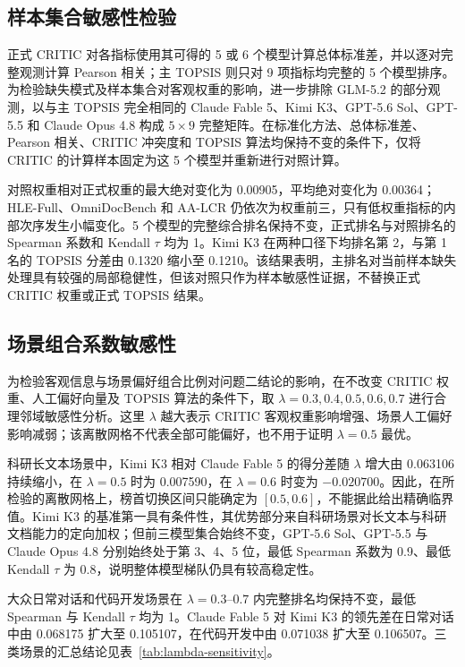 \documentclass[UTF8,zihao=-4,a4paper,fontset=none]{ctexart}
\begin{document}
\subsection{样本集合敏感性检验}

正式 CRITIC 对各指标使用其可得的 5 或 6 个模型计算总体标准差，并以逐对完整观测计算 Pearson 相关；主 TOPSIS 则只对 9 项指标均完整的 5 个模型排序。为检验缺失模式及样本集合对客观权重的影响，进一步排除 GLM-5.2 的部分观测，以与主 TOPSIS 完全相同的 Claude Fable 5、Kimi K3、GPT-5.6 Sol、GPT-5.5 和 Claude Opus 4.8 构成 $5\times9$ 完整矩阵。在标准化方法、总体标准差、Pearson 相关、CRITIC 冲突度和 TOPSIS 算法均保持不变的条件下，仅将 CRITIC 的计算样本固定为这 5 个模型并重新进行对照计算。

对照权重相对正式权重的最大绝对变化为 0.00905，平均绝对变化为 0.00364；HLE-Full、OmniDocBench 和 AA-LCR 仍依次为权重前三，只有低权重指标的内部次序发生小幅变化。5 个模型的完整综合排名保持不变，正式排名与对照排名的 Spearman 系数和 Kendall $\tau$ 均为 1。Kimi K3 在两种口径下均排名第 2，与第 1 名的 TOPSIS 分差由 0.1320 缩小至 0.1210。该结果表明，主排名对当前样本缺失处理具有较强的局部稳健性，但该对照只作为样本敏感性证据，不替换正式 CRITIC 权重或正式 TOPSIS 结果。

\subsection{场景组合系数敏感性}

为检验客观信息与场景偏好组合比例对问题二结论的影响，在不改变 CRITIC 权重、人工偏好向量及 TOPSIS 算法的条件下，取 $\lambda=0.3,0.4,0.5,0.6,0.7$ 进行合理邻域敏感性分析。这里 $\lambda$ 越大表示 CRITIC 客观权重影响增强、场景人工偏好影响减弱；该离散网格不代表全部可能偏好，也不用于证明 $\lambda=0.5$ 最优。

科研长文本场景中，Kimi K3 相对 Claude Fable 5 的得分差随 $\lambda$ 增大由 0.063106 持续缩小，在 $\lambda=0.5$ 时为 0.007590，在 $\lambda=0.6$ 时变为 $-0.020700$。因此，在所检验的离散网格上，榜首切换区间只能确定为 $[0.5,0.6]$，不能据此给出精确临界值。Kimi K3 的基准第一具有条件性，其优势部分来自科研场景对长文本与科研文档能力的定向加权；但前三模型集合始终不变，GPT-5.6 Sol、GPT-5.5 与 Claude Opus 4.8 分别始终处于第 3、4、5 位，最低 Spearman 系数为 0.9、最低 Kendall $\tau$ 为 0.8，说明整体模型梯队仍具有较高稳定性。

大众日常对话和代码开发场景在 $\lambda=0.3$--$0.7$ 内完整排名均保持不变，最低 Spearman 与 Kendall $\tau$ 均为 1。Claude Fable 5 对 Kimi K3 的领先差在日常对话中由 0.068175 扩大至 0.105107，在代码开发中由 0.071038 扩大至 0.106507。三类场景的汇总结论见表~\ref{tab:lambda-sensitivity}。
\end{document}
